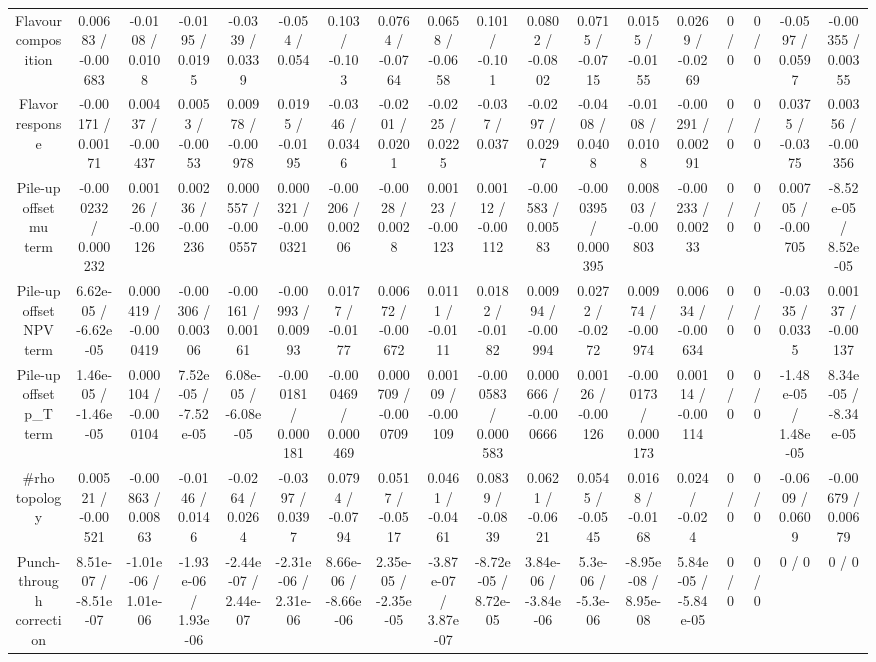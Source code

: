 \documentclass[10pt]{article}
\begin{document}
\begin{table}[htbp]
\begin{center}
\begin{tabular}{|c|c|c|c|c|c|c|c|c|c|c|c|c|c|c|c|c|c|}
  Flavour composition & 0.00683 / -0.00683 & -0.0108 / 0.0108 & -0.0195 / 0.0195 & -0.0339 / 0.0339 & -0.054 / 0.054 & 0.103 / -0.103 & 0.0764 / -0.0764 & 0.0658 / -0.0658 & 0.101 / -0.101 & 0.0802 / -0.0802 & 0.0715 / -0.0715 & 0.0155 / -0.0155 & 0.0269 / -0.0269 & 0 / 0 & 0 / 0 & -0.0597 / 0.0597 & -0.00355 / 0.00355 \\ 
  Flavor response & -0.00171 / 0.00171 & 0.00437 / -0.00437 & 0.0053 / -0.0053 & 0.00978 / -0.00978 & 0.0195 / -0.0195 & -0.0346 / 0.0346 & -0.0201 / 0.0201 & -0.0225 / 0.0225 & -0.037 / 0.037 & -0.0297 / 0.0297 & -0.0408 / 0.0408 & -0.0108 / 0.0108 & -0.00291 / 0.00291 & 0 / 0 & 0 / 0 & 0.0375 / -0.0375 & 0.00356 / -0.00356 \\ 
  Pile-up offset mu term & -0.000232 / 0.000232 & 0.00126 / -0.00126 & 0.00236 / -0.00236 & 0.000557 / -0.000557 & 0.000321 / -0.000321 & -0.00206 / 0.00206 & -0.0028 / 0.0028 & 0.00123 / -0.00123 & 0.00112 / -0.00112 & -0.00583 / 0.00583 & -0.000395 / 0.000395 & 0.00803 / -0.00803 & -0.00233 / 0.00233 & 0 / 0 & 0 / 0 & 0.00705 / -0.00705 & -8.52e-05 / 8.52e-05 \\ 
  Pile-up offset NPV term & 6.62e-05 / -6.62e-05 & 0.000419 / -0.000419 & -0.00306 / 0.00306 & -0.00161 / 0.00161 & -0.00993 / 0.00993 & 0.0177 / -0.0177 & 0.00672 / -0.00672 & 0.0111 / -0.0111 & 0.0182 / -0.0182 & 0.00994 / -0.00994 & 0.0272 / -0.0272 & 0.00974 / -0.00974 & 0.00634 / -0.00634 & 0 / 0 & 0 / 0 & -0.0335 / 0.0335 & 0.00137 / -0.00137 \\ 
  Pile-up offset p_{T} term & 1.46e-05 / -1.46e-05 & 0.000104 / -0.000104 & 7.52e-05 / -7.52e-05 & 6.08e-05 / -6.08e-05 & -0.000181 / 0.000181 & -0.000469 / 0.000469 & 0.000709 / -0.000709 & 0.00109 / -0.00109 & -0.000583 / 0.000583 & 0.000666 / -0.000666 & 0.00126 / -0.00126 & -0.000173 / 0.000173 & 0.00114 / -0.00114 & 0 / 0 & 0 / 0 & -1.48e-05 / 1.48e-05 & 8.34e-05 / -8.34e-05 \\ 
  #rho topology & 0.00521 / -0.00521 & -0.00863 / 0.00863 & -0.0146 / 0.0146 & -0.0264 / 0.0264 & -0.0397 / 0.0397 & 0.0794 / -0.0794 & 0.0517 / -0.0517 & 0.0461 / -0.0461 & 0.0839 / -0.0839 & 0.0621 / -0.0621 & 0.0545 / -0.0545 & 0.0168 / -0.0168 & 0.024 / -0.024 & 0 / 0 & 0 / 0 & -0.0609 / 0.0609 & -0.00679 / 0.00679 \\ 
  Punch-through correction & 8.51e-07 / -8.51e-07 & -1.01e-06 / 1.01e-06 & -1.93e-06 / 1.93e-06 & -2.44e-07 / 2.44e-07 & -2.31e-06 / 2.31e-06 & 8.66e-06 / -8.66e-06 & 2.35e-05 / -2.35e-05 & -3.87e-07 / 3.87e-07 & -8.72e-05 / 8.72e-05 & 3.84e-06 / -3.84e-06 & 5.3e-06 / -5.3e-06 & -8.95e-08 / 8.95e-08 & 5.84e-05 / -5.84e-05 & 0 / 0 & 0 / 0 & 0 / 0 & 0 / 0 \\ 

\end{tabular}
\end{center}
\end{table}
\end{document}
